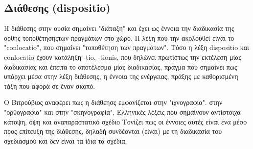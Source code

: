





\subsection{Διάθεσης (dispositio)}
  
Η διάθεσης στην ουσία σημαίνει "διάταξη" και έχει ως έννοια την διαδικασία της ορθής τοποθέτησηςτων πραγμάτων στο χώρο. \cite[σ.~49-50,93]{vitruvius-lefas} Η λέξη που την ακολουθεί είναι το "conlocatio", που σημαίνει "τοποθέτηση των πραγμάτων". Τόσο η λέξη dispositio και conlocatio έχουν κατάληξη -tio, -tionis, που δηλώνει πρωτίστως την εκτέλεση μίας διαδικασίας και έπειτα το αποτέλεσμα μίας διαδικασίας, πράγμα που σημαίνει πως υπάρχει μέσα στην λέξη διάθεσης, η έννοια της ενέργειας, πράξης με καθορισμένη τάξη που αφορά σε έναν σκοπό. \cite[σ.~496]{scranton_vitruvius_1974}

Ο Βιτρούβιος αναφέρει πως η διάθεησς εμφανίζεται στην "ιχνογραφία". στην "ορθογραφία" και στην "σκηνογραφία", Ελληνικές λέξεις που σημαίνουν αντίστοιχα κάτοψη, όψη και αναπαραστατικό σχέδιο \cite[σ.~50-51,94]{vitruvius-lefas} Τονίζει πως οι έννοιες αυτές είναι ένα μέσο προς επίτευξη της διάθεσης, δηλαδή συνδέονται (είναι) με τη διαδικασία του σχεδιασμού και δεν είναι τα ίδια τα σχέδια. 
  
  
  
